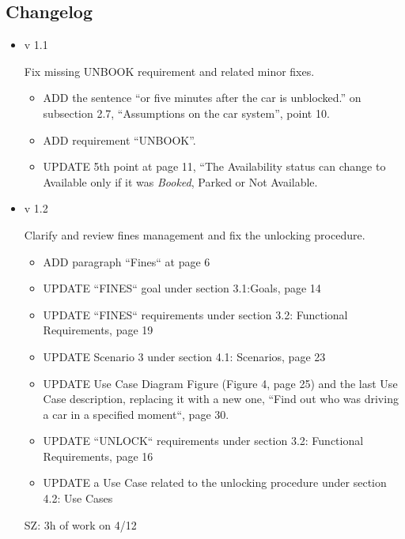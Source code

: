 \documentclass[11pt]{article} %
\begin{document}
\subsection{Changelog
}
\begin{itemize}
	
	\item v 1.1

	Fix missing UNBOOK requirement and related minor fixes.
	\begin{itemize}
		\item ADD the sentence ``or five minutes after the car is unblocked.'' on subsection 2.7, ``Assumptions on the car system'', point 10.
		\item ADD requirement ``UNBOOK''.
		\item UPDATE 5th point at page 11, ``The Availability status can change to Available only if it was \textit{Booked}, Parked or Not Available.
	\end{itemize}
	
	\item v 1.2
	
	Clarify and review fines management and fix the unlocking procedure.
	\begin{itemize}
		\item ADD paragraph ``Fines`` at page 6
		\item UPDATE ``FINES`` goal under section 3.1:Goals, page 14
		\item UPDATE ``FINES`` requirements under section 3.2: Functional Requirements, page 19
		\item UPDATE Scenario 3 under section 4.1: Scenarios, page 23
		\item UPDATE Use Case Diagram Figure (Figure 4, page 25) and the last Use Case description, replacing it with a new one, ``Find out who was driving a car in a specified moment``, page 30.
		\item UPDATE ``UNLOCK`` requirements under section 3.2: Functional Requirements, page 16
		\item UPDATE a Use Case related to the unlocking procedure under section 4.2: Use Cases
	\end{itemize}
	SZ: 3h of work on 4/12
	
\end{itemize}
\end{document}
